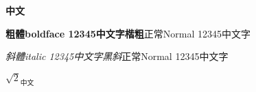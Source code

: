 \documentclass{article}
\begin{document}
\textbf{中文}

\textbf{粗體boldface 12345中文字{\Kai 楷粗}}正常Normal 12345中文字

\textit{斜體italic 12345中文字{\Hei 黑斜}}\:正常Normal 12345中文字

$\sqrt{2}_{\text{中文}}$      %
\end{document}
